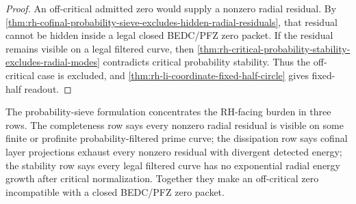 \begin{proof}
An off-critical admitted zero would supply a nonzero radial residual.
By
\autoref{thm:rh-cofinal-probability-sieve-excludes-hidden-radial-residuals},
that residual cannot be hidden inside a legal closed BEDC/PFZ zero
packet.  If the residual remains visible on a legal filtered curve, then
\autoref{thm:rh-critical-probability-stability-excludes-radial-modes}
contradicts critical probability stability.  Thus the off-critical case
is excluded, and \autoref{thm:rh-li-coordinate-fixed-half-circle} gives
fixed-half readout.
\end{proof}

\begin{principle}
\label{prin:rh-probability-sieve-audit-boundary}
The probability-sieve formulation concentrates the RH-facing burden in
three rows.  The completeness row says every nonzero radial residual is
visible on some finite or profinite probability-filtered prime curve;
the dissipation row says cofinal layer projections exhaust every
nonzero residual with divergent detected energy; the stability row says
every legal filtered curve has no exponential radial energy growth
after critical normalization.  Together they make an off-critical zero
incompatible with a closed BEDC/PFZ zero packet.
\end{principle}
